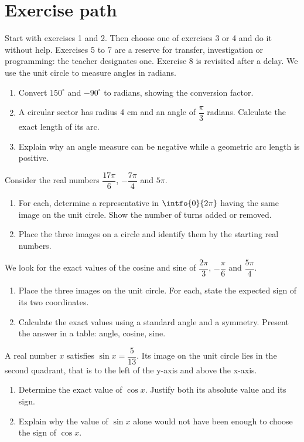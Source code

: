 \section*{Exercise path}\label{C10-PARC}
Start with exercises 1 and 2. Then choose one of exercises 3 or 4 and do it without help. Exercises 5 to 7 are a reserve for transfer, investigation or programming: the teacher designates one. Exercise 8 is revisited after a delay.
\begingroup
{}
We use the unit circle to measure angles in radians.
\begin{enumerate}[label=\arabic*.]
\item Convert $150^\circ$ and $-90^\circ$ to radians, showing the conversion factor.
\item A circular sector has radius 4 cm and an angle of $\dfrac\pi3$ radians. Calculate the exact length of its arc.
\item Explain why an angle measure can be negative while a geometric arc length is positive.
\end{enumerate}
Consider the real numbers $\dfrac{17\pi}{6}$, $-\dfrac{7\pi}{4}$ and $5\pi$.
\begin{enumerate}[label=\arabic*.]
\item For each, determine a representative in $\intfo{0}{2\pi}$ having the same image on the unit circle. Show the number of turns added or removed.
\item Place the three images on a circle and identify them by the starting real numbers.
\end{enumerate}
We look for the exact values of the cosine and sine of $\dfrac{2\pi}{3}$, $-\dfrac\pi6$ and $\dfrac{5\pi}{4}$.
\begin{enumerate}[label=\arabic*.]
\item Place the three images on the unit circle. For each, state the expected sign of its two coordinates.
\item Calculate the exact values using a standard angle and a symmetry. Present the answer in a table: angle, cosine, sine.
\end{enumerate}
A real number $x$ satisfies $\sin x=\dfrac5{13}$. Its image on the unit circle lies in the second quadrant, that is to the left of the y-axis and above the x-axis.
\begin{enumerate}[label=\arabic*.]
\item Determine the exact value of $\cos x$. Justify both its absolute value and its sign.
\item Explain why the value of $\sin x$ alone would not have been enough to choose the sign of $\cos x$.
\end{enumerate}
